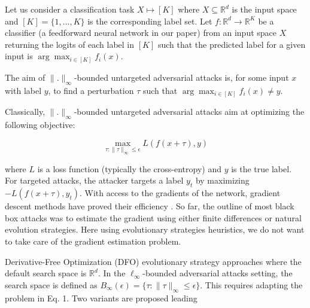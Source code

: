Let us consider a classification task $X \mapsto [K]$ where $X \subseteq \mathbb{R}^d$ is the input space and $[K] = \{1, \ldots, K\}$ is the corresponding label set. Let $f : \mathbb{R}^d \to \mathbb{R}^K$ be a classifier (a feedforward neural network in our paper) from an input space $X$ returning the logits of each label in $[K]$ such that the predicted label for a given input is $\arg \max_{i \in [K]} f_i(x)$.

The aim of $\|.\|_\infty$-bounded untargeted adversarial attacks is, for some input $x$ with label $y$, to find a perturbation $\tau$ such that $\arg \max_{i \in [K]} f_i(x) \neq y$. 

Classically, $\|.\|_\infty$-bounded untargeted adversarial attacks aim at optimizing the following objective:

\[
\max_{\tau: \|\tau\|_\infty \leq \epsilon} L(f(x + \tau), y)
\]

where $L$ is a loss function (typically the cross-entropy) and $y$ is the true label. For targeted attacks, the attacker targets a label $y_t$ by maximizing $-L(f(x + \tau), y_t)$. With access to the gradients of the network, gradient descent methods have proved their efficiency \cite{Kurakin2016, Madry2018a}. So far, the outline of most black box attacks was to estimate the gradient using either finite differences or natural evolution strategies. Here using evolutionary strategies heuristics, we do not want to take care of the gradient estimation problem.

Derivative-Free Optimization (DFO) evolutionary strategy approaches where the default search space is $\mathbb{R}^d$. In the $\ell_\infty$-bounded adversarial attacks setting, the search space is defined as $B_\infty(\epsilon) = \{\tau : \|\tau\|_\infty \leq \epsilon\}$. This requires adapting the problem in Eq. 1. Two variants are proposed leading
